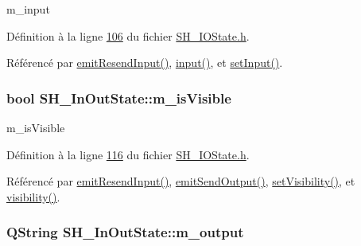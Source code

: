 m\-\_\-input 



Définition à la ligne \hyperlink{SH__IOState_8h_source_l00106}{106} du fichier \hyperlink{SH__IOState_8h_source}{S\-H\-\_\-\-I\-O\-State.\-h}.



Référencé par \hyperlink{classSH__InOutState_ad1695493d39c5194e5b7c6372754ddd7}{emit\-Resend\-Input()}, \hyperlink{classSH__InOutState_a8e1b78069343122df7713624a1a5a100}{input()}, et \hyperlink{classSH__InOutState_aaec9c2b5ef7c406bff7469461352d47c}{set\-Input()}.

\hypertarget{classSH__InOutState_a8fd66b185c9a55f0e84daa97e2acf53a}{
\subsubsection[{m\-\_\-is\-Visible}]{\setlength{\rightskip}{0pt plus 5cm}bool S\-H\-\_\-\-In\-Out\-State\-::m\-\_\-is\-Visible\hspace{0.3cm}{\ttfamily [private]}}}\label{classSH__InOutState_a8fd66b185c9a55f0e84daa97e2acf53a}


m\-\_\-is\-Visible 



Définition à la ligne \hyperlink{SH__IOState_8h_source_l00116}{116} du fichier \hyperlink{SH__IOState_8h_source}{S\-H\-\_\-\-I\-O\-State.\-h}.



Référencé par \hyperlink{classSH__InOutState_ad1695493d39c5194e5b7c6372754ddd7}{emit\-Resend\-Input()}, \hyperlink{classSH__InOutState_a40995f4a8201f21d26b7e78b7e7b652e}{emit\-Send\-Output()}, \hyperlink{classSH__InOutState_a7fdfaa6f600f0ac4a96f238a038ba9ad}{set\-Visibility()}, et \hyperlink{classSH__InOutState_a3a18752c4122c26a2ebf38310c9c1b75}{visibility()}.

\hypertarget{classSH__InOutState_ae735e741ce229d2600448d8daa0abc2d}{
\subsubsection[{m\-\_\-output}]{\setlength{\rightskip}{0pt plus 5cm}Q\-String S\-H\-\_\-\-In\-Out\-State\-::m\-\_\-output\hspace{0.3cm}{\ttfamily [private]}}}\label{classSH__InOutState_ae735e741ce229d2600448d8daa0abc2d}



